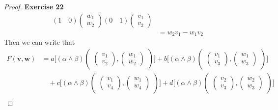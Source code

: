 \documentclass[11pt]{article}
\theoremstyle{definition}
\begin{document}
\begin{proof}{\textbf{Exercise 22}}
\begin{align*}
        (1\quad 0)\begin{pmatrix} w_1\\ w_2 \end{pmatrix}
        (0\quad 1)\begin{pmatrix} v_1\\ v_2 \end{pmatrix}\\
        &= w_2v_1 - w_1v_2
    \end{align*}
    Then we can write that
    \begin{align*}
        F(\bm{v}, \bm{w}) &= a\bigg[(\alpha\wedge\beta)\begin{pmatrix}
            \begin{pmatrix} v_1\\ v_2 \end{pmatrix},
            \begin{pmatrix} w_1\\ w_2 \end{pmatrix}
        \end{pmatrix}\bigg] + b\bigg[(\alpha\wedge\beta)\begin{pmatrix}
            \begin{pmatrix} v_1\\ v_3 \end{pmatrix},
            \begin{pmatrix} w_1\\ w_3 \end{pmatrix}
        \end{pmatrix}\bigg]\\
        &\quad + c\bigg[(\alpha\wedge\beta)\begin{pmatrix}
            \begin{pmatrix} v_1\\ v_4 \end{pmatrix},
            \begin{pmatrix} w_1\\ w_4 \end{pmatrix}
        \end{pmatrix}\bigg] + d\bigg[(\alpha\wedge\beta)\begin{pmatrix}
            \begin{pmatrix} v_2\\ v_3 \end{pmatrix},
            \begin{pmatrix} w_2\\ w_3 \end{pmatrix}
        \end{pmatrix}\bigg]\\

\end{align*}
\end{proof}
\end{document}
